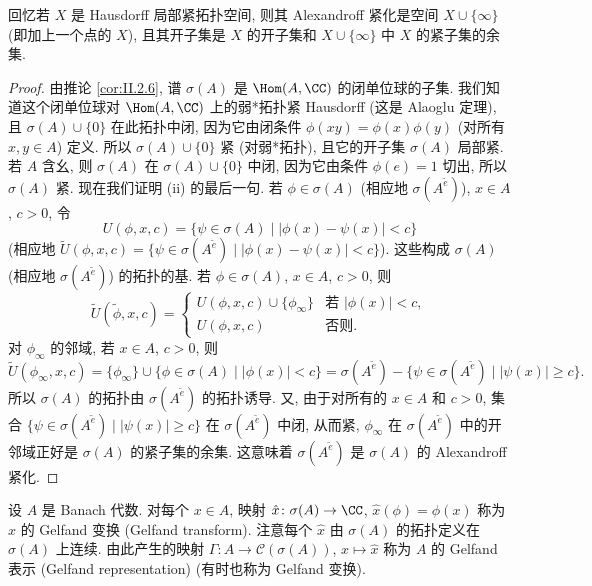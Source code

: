 回忆若 $X$ 是 Hausdorff 局部紧拓扑空间, 则其 Alexandroff 紧化是空间 $X \cup \{\infty\}$ (即加上一个点的 $X$), 且其开子集是 $X$ 的开子集和 $X \cup \{\infty\}$ 中 $X$ 的紧子集的余集.

\begin{proof}
由推论 \ref{cor:II.2.6}, 谱 $\sigma(A)$ 是 $\Hom(A, \CC)$ 的闭单位球的子集. 我们知道这个闭单位球对 $\Hom(A, \CC)$ 上的弱*拓扑紧 Hausdorff (这是 Alaoglu 定理), 且 $\sigma(A) \cup \{0\}$ 在此拓扑中闭, 因为它由闭条件 $\phi(xy) = \phi(x)\phi(y)$ (对所有 $x, y \in A$) 定义. 所以 $\sigma(A) \cup \{0\}$ 紧 (对弱*拓扑), 且它的开子集 $\sigma(A)$ 局部紧. 若 $A$ 含幺, 则 $\sigma(A)$ 在 $\sigma(A) \cup \{0\}$ 中闭, 因为它由条件 $\phi(e) = 1$ 切出, 所以 $\sigma(A)$ 紧.
现在我们证明 (ii) 的最后一句. 若 $\phi \in \sigma(A)$ (相应地 $\sigma(A^{\tilde{e}})$), $x \in A$, $c > 0$, 令
\[
U(\phi, x, c) = \{\psi \in \sigma(A) \mid |\phi(x) - \psi(x)| < c\}
\]
(相应地 $\tilde{U}(\phi, x, c) = \{\psi \in \sigma(A^{\tilde{e}}) \mid |\phi(x) - \psi(x)| < c\}$).
这些构成 $\sigma(A)$ (相应地 $\sigma(A^{\tilde{e}})$) 的拓扑的基.
若 $\phi \in \sigma(A)$, $x \in A$, $c > 0$, 则
\[
\tilde{U}(\tilde{\phi}, x, c) = \begin{cases} U(\phi, x, c) \cup \{\phi_{\infty}\} & \text{若 } |\phi(x)| < c, \\ U(\phi, x, c) & \text{否则}. \end{cases}
\]
对 $\phi_{\infty}$ 的邻域, 若 $x \in A$, $c > 0$, 则
\[
\tilde{U}(\phi_{\infty}, x, c) = \{\phi_{\infty}\} \cup \{\phi \in \sigma(A) \mid |\phi(x)| < c\} = \sigma(A^{\tilde{e}}) - \{\psi \in \sigma(A^{\tilde{e}}) \mid |\psi(x)| \geq c\}.
\]
所以 $\sigma(A)$ 的拓扑由 $\sigma(A^{\tilde{e}})$ 的拓扑诱导. 又, 由于对所有的 $x \in A$ 和 $c > 0$, 集合 $\{\psi \in \sigma(A^{\tilde{e}}) \mid |\psi(x)| \geq c\}$ 在 $\sigma(A^{\tilde{e}})$ 中闭, 从而紧, $\phi_{\infty}$ 在 $\sigma(A^{\tilde{e}})$ 中的开邻域正好是 $\sigma(A)$ 的紧子集的余集. 这意味着 $\sigma(A^{\tilde{e}})$ 是 $\sigma(A)$ 的 Alexandroff 紧化.
\end{proof}

\begin{definition}
\label{def:II.2.8}
设 $A$ 是 Banach 代数. 对每个 $x \in A$, 映射 $\hat{x} \colon \sigma(A) \to \CC$, $\hat{x}(\phi) = \phi(x)$ 称为 $x$ 的 Gelfand 变换 (Gelfand transform).
注意每个 $\hat{x}$ 由 $\sigma(A)$ 的拓扑定义在 $\sigma(A)$ 上连续. 由此产生的映射 $\Gamma \colon A \to \mathcal{C}(\sigma(A))$, $x \longmapsto \hat{x}$ 称为 $A$ 的 Gelfand 表示 (Gelfand representation) (有时也称为 Gelfand 变换).
\end{definition}

